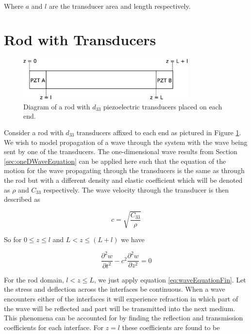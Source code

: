 Where $a$ and $l$ are the transducer area and length respectively. 

\section{Rod with Transducers}
\label{sec:rodWithTrans}

\begin{figure}[ht!]
\centering
\includegraphics[width=0.8\textwidth]{eps_pics/rodTrans.eps}
\caption{Diagram of a rod with $d_{33}$ piezoelectric transducers placed on each end.
	 \label{fig:rodTrans}} 
\end{figure}

Consider a rod with $d_{33}$ transducers affixed to each end as pictured in Figure \ref{fig:rodTrans}. We wish to model propagation of a wave through the system with the wave being sent by one of the transducers. The one-dimensional wave results from Section \ref{sec:oneDWaveEquation} can be applied here such that the equation of the motion for the wave propagating through the transducers is the same as through the rod but with a different density and elastic coefficient which will be denoted as $\rho$ and $C_{33}$ respectively. The wave velocity through the transducer is then described as

\begin{equation}
c = \sqrt{\frac{C_{33}}{\rho}}
\end{equation}


So for $0 \le z \le l$ and $L < z \le (L+l)$ we have

\begin{equation}
\frac{\partial ^2w}{\partial t^2} - c^2 \frac{\partial ^2w}{\partial z^2} = 0
\label{eq:transWaveEquationFin}
\end{equation}

For the rod domain, $l < z \le L$, we just apply equation \ref{eq:waveEquationFin}. Let the stress and deflection across the interfaces be continuous. When a wave encounters either of the interfaces it will experience refraction in which part of the wave will be reflected and part will be transmitted into the next medium. This phenomena can be accounted for by finding the reflection and transmission coefficients for each interface. For $z = l$ these coefficients are found to be

